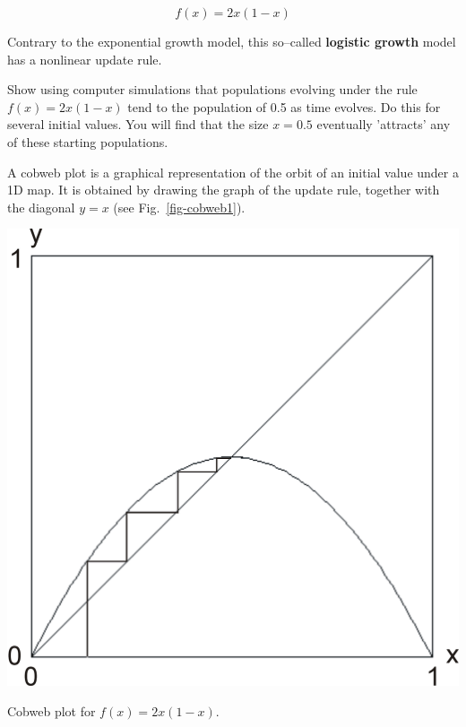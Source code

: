 \begin{equation}
f(x) = 2 x (1-x) \label{eq-logistic-growth}
\end{equation} 

Contrary to the exponential growth model, this so--called \textbf{logistic growth} model has a nonlinear update rule.

\begin{exer}
Show using computer simulations that populations evolving under the rule $f(x) = 2 x (1-x)$ tend to the population of 0.5 as time evolves. Do this for several initial values. You will find that the size $x=0.5$ eventually 'attracts' any of these starting populations.
\end{exer}

\pagebreak


A cobweb plot is a graphical representation of the orbit of an initial value under a 1D map. It is obtained by drawing the graph of the update rule, together with the diagonal $y=x$ (see Fig.~\ref{fig-cobweb1}).

\begin{marginfigure}
\centering
\includegraphics{dynamic/figures/cobweb1}
\caption{Cobweb plot for $f(x)=2x(1-x)$.}
\label{fig-cobweb1}
\end{marginfigure} 

